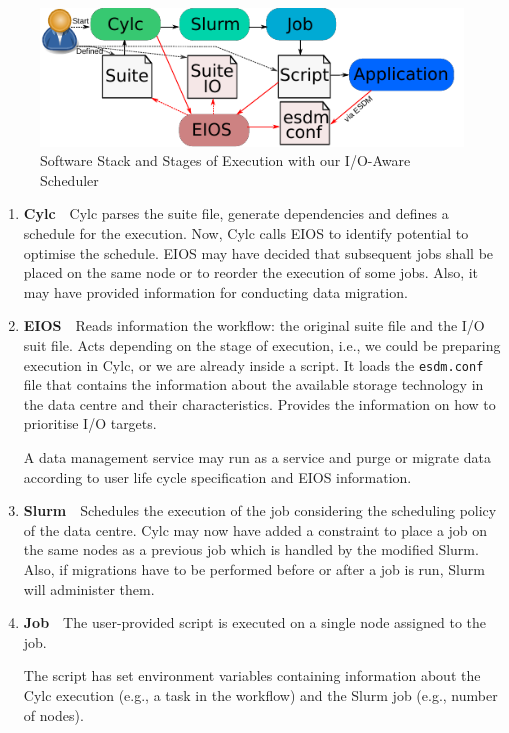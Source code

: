 \documentclass[a4paper]{article}
\begin{document}
\begin{figure}[H]
  \centering
  \includegraphics[scale=1.4]{stages-io}
  \caption{Software Stack and Stages of Execution with our I/O-Aware Scheduler}
  \label{fig:stages-io}
\end{figure}


\begin{enumerate}
  \item \textbf{Cylc}\ \ Cylc parses the suite file, generate dependencies and defines a schedule for the execution.
  Now, Cylc calls EIOS to identify potential to optimise the schedule.
  EIOS may have decided that subsequent jobs shall be placed on the same node or to reorder the execution of some jobs.
  Also, it may have provided information for conducting data migration.

  \item \textbf{EIOS}\ \
  Reads information the workflow: the original suite file and the I/O suit file.
  Acts depending on the stage of execution, i.e., we could be preparing execution in Cylc, or we are already inside a script.
  It loads the \texttt{esdm.conf} file that contains the information about the available storage technology in the data centre and their characteristics.
  Provides the information on how to prioritise I/O targets.

  A data management service may run as a service and purge or migrate data according to user life cycle specification and EIOS information.

  \item \textbf{Slurm}\ \ Schedules the execution of the job considering the scheduling policy of the data centre.
  Cylc may now have added a constraint to place a job on the same nodes as a previous job which is handled by the modified Slurm.
  Also, if migrations have to be performed before or after a job is run, Slurm will administer them.

  \item \textbf{Job}\ \ The user-provided script is executed on a single node assigned to the job.

  The script has set environment variables containing information about the Cylc execution (e.g., a task in the workflow) and the Slurm job (e.g., number of nodes).


\end{enumerate}
\end{document}
